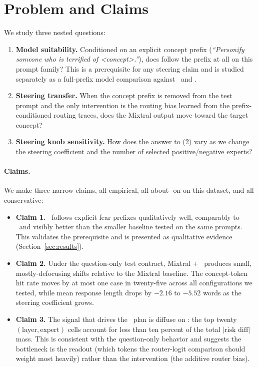 \section{Problem and Claims}
\label{sec:problem}

We study three nested questions:

\begin{enumerate}
  \item \textbf{Model suitability.} Conditioned on an explicit concept
  prefix (\emph{``Personify someone who is terrified of \textit{<concept>}.''}),
  does \mixtral follow the prefix at all on this prompt family? This is a
  prerequisite for any steering claim and is studied separately as a
  full-prefix model comparison against \llama~and \olmoe.
  \item \textbf{Steering transfer.} When the concept prefix is removed from
  the test prompt and the only intervention is the \steermoe routing bias
  learned from the prefix-conditioned routing traces, does the Mixtral output
  move toward the target concept?
  \item \textbf{Steering knob sensitivity.} How does the answer to (2)
  vary as we change the steering coefficient and the number of selected
  positive/negative experts?
\end{enumerate}

\paragraph{Claims.}
We make three narrow claims, all empirical, all about \steermoe-on-\mixtral on
this dataset, and all conservative:

\begin{itemize}
  \item \textbf{Claim 1.} \mixtral~follows explicit fear prefixes
  qualitatively well, comparably to \llama~and visibly better than the
  smaller \olmoe baseline tested on the same prompts. This validates the
  prerequisite and is presented as qualitative evidence (Section~\ref{sec:results}).
  \item \textbf{Claim 2.} Under the question-only test contract, Mixtral +
  \steermoe~produces small, mostly-defocusing shifts relative to the Mixtral
  baseline. The concept-token hit rate moves by at most one case in twenty-five
  across all configurations we tested, while mean response length drops by
  $-2.16$ to $-5.52$ words as the steering coefficient grows.
  \item \textbf{Claim 3.} The signal that drives the \steermoe~plan is
  diffuse on \mixtral: the top twenty $(\text{layer}, \text{expert})$ cells
  account for less than ten percent of the total $|\text{risk diff}|$ mass.
  This is consistent with the question-only behavior and suggests the
  bottleneck is the readout (which tokens the router-logit comparison should
  weight most heavily) rather than the intervention (the additive router bias).
\end{itemize}

